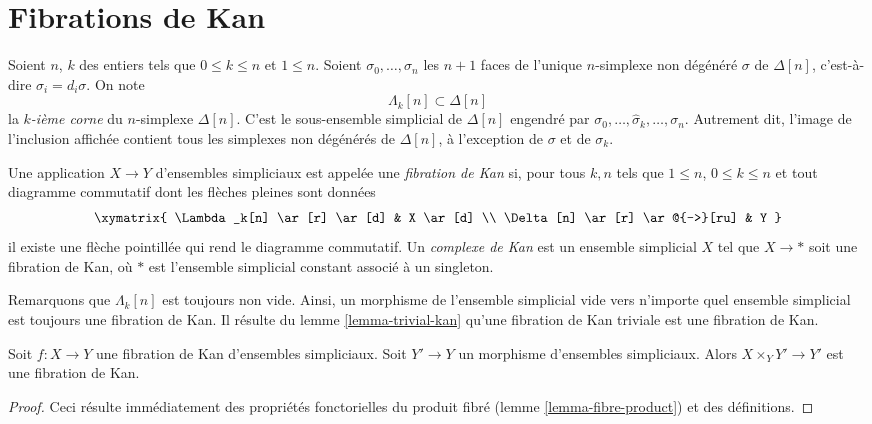 \section{Fibrations de Kan}
\label{section-kan}

\noindent
Soient $n$, $k$ des entiers tels que $0 \leq k \leq n$ et $1 \leq n$.
Soient $\sigma_0, \ldots, \sigma_n$
les $n + 1$ faces de l'unique $n$-simplexe non dégénéré $\sigma$
de $\Delta[n]$, c'est-à-dire $\sigma_i = d_i\sigma$. On note
$$
\Lambda_k[n] \subset \Delta[n]
$$
la {\it $k$-ième corne} du $n$-simplexe $\Delta[n]$. C'est le
sous-ensemble simplicial de $\Delta[n]$ engendré par
$\sigma_0, \ldots, \hat \sigma_k, \ldots, \sigma_n$. Autrement dit,
l'image de l'inclusion affichée contient tous les simplexes non dégénérés
de $\Delta[n]$, à l'exception de $\sigma$ et de $\sigma_k$.

\begin{definition}
\label{definition-kan}
Une application $X \to Y$ d'ensembles simpliciaux est appelée une
{\it fibration de Kan} si, pour tous $k, n$ tels que $1 \leq n$,
$0 \leq k \leq n$ et tout diagramme commutatif dont les flèches pleines
sont données
$$
\xymatrix{
\Lambda_k[n] \ar[r] \ar[d] & X \ar[d] \\
\Delta[n] \ar[r] \ar@{-->}[ru] & Y
}
$$
il existe une flèche pointillée qui rend le diagramme commutatif. Un
{\it complexe de Kan} est un ensemble simplicial $X$ tel que $X \to *$
soit une fibration de Kan, où $*$ est l'ensemble simplicial constant
associé à un singleton.
\end{definition}

\noindent
Remarquons que $\Lambda_k[n]$ est toujours non vide. Ainsi, un morphisme de
l'ensemble simplicial vide vers n'importe quel ensemble simplicial est
toujours une fibration de Kan. Il résulte du lemme
\ref{lemma-trivial-kan} qu'une fibration de Kan triviale est une fibration
de Kan.

\begin{lemma}
\label{lemma-kan-base-change}
Soit $f : X \to Y$ une fibration de Kan d'ensembles simpliciaux.
Soit $Y' \to Y$ un morphisme d'ensembles simpliciaux.
Alors $X \times_Y Y' \to Y'$ est une fibration de Kan.
\end{lemma}

\begin{proof}
Ceci résulte immédiatement des propriétés fonctorielles du produit fibré
(lemme \ref{lemma-fibre-product}) et des définitions.
\end{proof}

